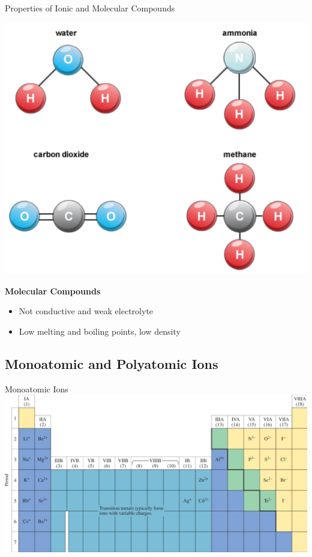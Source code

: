 \documentclass[11pt]{beamer}
\begin{document}
\begin{frame}{Properties of Ionic and Molecular Compounds}
  \begin{center}
    \includegraphics[width=0.6\linewidth]{molec_example}
  \end{center}
  \vspace{-0.3in}
  \textbf{Molecular Compounds}
  \begin{itemize}
  \item Not conductive and weak electrolyte
  \item Low melting and boiling points, low density
  \end{itemize}
\end{frame}

\subsection{Monoatomic and Polyatomic Ions}

\begin{frame}{Monoatomic Ions}
  \centering
  \includegraphics[width=\linewidth]{monoatomic_ion}
\end{frame}
\end{document}
